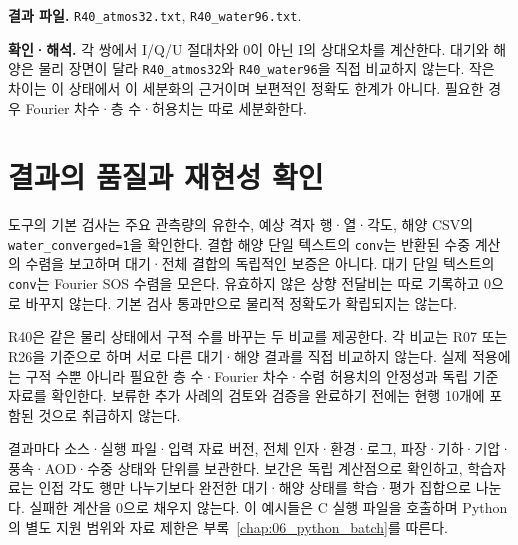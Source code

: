 \textbf{결과 파일. }\texttt{R40\_\allowbreak{}atmos32.txt}, \texttt{R40\_\allowbreak{}water96.txt}.

\textbf{확인·해석. }각 쌍에서 I/Q/U 절대차와 0이 아닌 I의 상대오차를 계산한다. 대기와 해양은 물리 장면이 달라 \texttt{R40\_\allowbreak{}atmos32}와 \texttt{R40\_\allowbreak{}water96}을 직접 비교하지 않는다. 작은 차이는 이 상태에서 이 세분화의 근거이며 보편적인 정확도 한계가 아니다. 필요한 경우 Fourier 차수·층 수·허용치는 따로 세분화한다.

\clearpage

\section{결과의 품질과 재현성 확인}

\label{sec:auto:09_cookbook:7}

\label{sec:cookbook_quality}

도구의 기본 검사는 주요 관측량의 유한수, 예상 격자 행·열·각도, 해양 CSV의 \texttt{water\_\allowbreak{}converged=1}을 확인한다. 결합 해양 단일 텍스트의 \texttt{conv}는 반환된 수중 계산의 수렴을 보고하며 대기·전체 결합의 독립적인 보증은 아니다. 대기 단일 텍스트의 \texttt{conv}는 Fourier SOS 수렴을 모은다. 유효하지 않은 상향 전달비는 따로 기록하고 0으로 바꾸지 않는다. 기본 검사 통과만으로 물리적 정확도가 확립되지는 않는다.

R40은 같은 물리 상태에서 구적 수를 바꾸는 두 비교를 제공한다. 각 비교는 R07 또는 R26을 기준으로 하며 서로 다른 대기·해양 결과를 직접 비교하지 않는다. 실제 적용에는 구적 수뿐 아니라 필요한 층 수·Fourier 차수·수렴 허용치의 안정성과 독립 기준 자료를 확인한다. 보류한 추가 사례의 검토와 검증을 완료하기 전에는 현행 10개에 포함된 것으로 취급하지 않는다.

결과마다 소스·실행 파일·입력 자료 버전, 전체 인자·환경·로그, 파장·기하·기압·풍속·AOD·수중 상태와 단위를 보관한다. 보간은 독립 계산점으로 확인하고, 학습자료는 인접 각도 행만 나누기보다 완전한 대기·해양 상태를 학습·평가 집합으로 나눈다. 실패한 계산을 0으로 채우지 않는다. 이 예시들은 C 실행 파일을 호출하며 Python의 별도 지원 범위와 자료 제한은 부록~\ref{chap:06_python_batch}를 따른다.
